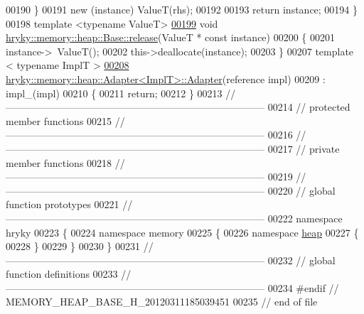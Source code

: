 \begin{DoxyCode}
00190     \}
00191     \textcolor{keyword}{new} (instance) ValueT(rhs);
00192     
00193     \textcolor{keywordflow}{return} instance;
00194 \}
00198 \textcolor{keyword}{template} <\textcolor{keyword}{typename} ValueT>
\hypertarget{memory__heap__base_8h_source_l00199}{}\hyperlink{classhryky_1_1memory_1_1heap_1_1_base_a03d3126311af90ea5c9807425fb971a6}{00199} \textcolor{keywordtype}{void} \hyperlink{namespacehryky_a9bdf380c3703ef316b807edae92a930a}{hryky::memory::heap::Base::release}(ValueT * \textcolor{keyword}{const} instance)
00200 \{
00201     instance->~ValueT();
00202     this->deallocate(instance);
00203 \}
00207 \textcolor{keyword}{template} < \textcolor{keyword}{typename} ImplT >
\hypertarget{memory__heap__base_8h_source_l00208}{}\hyperlink{classhryky_1_1memory_1_1heap_1_1_adapter_a7f9d6a8bed08928631c24e6bf74f581b}{00208} \hyperlink{classhryky_1_1memory_1_1heap_1_1_adapter}{hryky::memory::heap::Adapter<ImplT>::Adapter}(reference impl)
00209     : impl\_(impl)
00210 \{
00211     \textcolor{keywordflow}{return};
00212 \}
00213 \textcolor{comment}{//
      ------------------------------------------------------------------------------}
00214 \textcolor{comment}{// protected member functions}
00215 \textcolor{comment}{//
      ------------------------------------------------------------------------------}
00216 \textcolor{comment}{//
      ------------------------------------------------------------------------------}
00217 \textcolor{comment}{// private member functions}
00218 \textcolor{comment}{//
      ------------------------------------------------------------------------------}
00219 \textcolor{comment}{//
      ------------------------------------------------------------------------------}
00220 \textcolor{comment}{// global function prototypes}
00221 \textcolor{comment}{//
      ------------------------------------------------------------------------------}
00222 \textcolor{keyword}{namespace }hryky
00223 \{
00224 \textcolor{keyword}{namespace }memory
00225 \{
00226 \textcolor{keyword}{namespace }\hyperlink{namespacehryky_1_1memory_1_1global_a6fc6103f67c837aa0f39b359588409cd}{heap}
00227 \{
00228 \}
00229 \}
00230 \}
00231 \textcolor{comment}{//
      ------------------------------------------------------------------------------}
00232 \textcolor{comment}{// global function definitions}
00233 \textcolor{comment}{//
      ------------------------------------------------------------------------------}
00234 \textcolor{preprocessor}{#endif // MEMORY\_HEAP\_BASE\_H\_20120311185039451}
00235 \textcolor{preprocessor}{}\textcolor{comment}{// end of file}
\end{DoxyCode}
